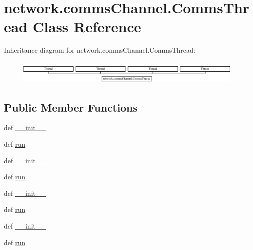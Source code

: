 \hypertarget{classnetwork_1_1commsChannel_1_1CommsThread}{}\section{network.\+comms\+Channel.\+Comms\+Thread Class Reference}
\label{classnetwork_1_1commsChannel_1_1CommsThread}
Inheritance diagram for network.\+comms\+Channel.\+Comms\+Thread\+:\begin{figure}[H]
\begin{center}
\leavevmode
\includegraphics[height=1.181435cm]{classnetwork_1_1commsChannel_1_1CommsThread}
\end{center}
\end{figure}
\subsection*{Public Member Functions}
\begin{DoxyCompactItemize}
\item 
def \hyperlink{classnetwork_1_1commsChannel_1_1CommsThread_a1a23f3e9d80d65392dc9c2710c95443a}{\+\_\+\+\_\+init\+\_\+\+\_\+}
\item 
def \hyperlink{classnetwork_1_1commsChannel_1_1CommsThread_a80d7c1196d9c22fa9b5c892187f0fda9}{run}
\item 
def \hyperlink{classnetwork_1_1commsChannel_1_1CommsThread_a1a23f3e9d80d65392dc9c2710c95443a}{\+\_\+\+\_\+init\+\_\+\+\_\+}
\item 
def \hyperlink{classnetwork_1_1commsChannel_1_1CommsThread_a80d7c1196d9c22fa9b5c892187f0fda9}{run}
\item 
def \hyperlink{classnetwork_1_1commsChannel_1_1CommsThread_a1a23f3e9d80d65392dc9c2710c95443a}{\+\_\+\+\_\+init\+\_\+\+\_\+}
\item 
def \hyperlink{classnetwork_1_1commsChannel_1_1CommsThread_a80d7c1196d9c22fa9b5c892187f0fda9}{run}
\item 
def \hyperlink{classnetwork_1_1commsChannel_1_1CommsThread_a1a23f3e9d80d65392dc9c2710c95443a}{\+\_\+\+\_\+init\+\_\+\+\_\+}
\item 
def \hyperlink{classnetwork_1_1commsChannel_1_1CommsThread_a80d7c1196d9c22fa9b5c892187f0fda9}{run}
\end{DoxyCompactItemize}
